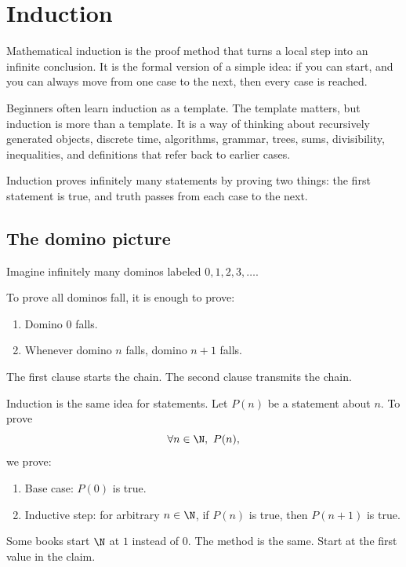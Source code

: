 \newpage
\section{Induction}

Mathematical induction is the proof method that turns a local step into an infinite conclusion. It is the formal version of a simple idea: if you can start, and you can always move from one case to the next, then every case is reached.

Beginners often learn induction as a template. The template matters, but induction is more than a template. It is a way of thinking about recursively generated objects, discrete time, algorithms, grammar, trees, sums, divisibility, inequalities, and definitions that refer back to earlier cases.

\begin{focusbox}
Induction proves infinitely many statements by proving two things: the first statement is true, and truth passes from each case to the next.
\end{focusbox}

\subsection{The domino picture}

Imagine infinitely many dominos labeled $0,1,2,3,\ldots$.

To prove all dominos fall, it is enough to prove:

\begin{enumerate}
\item Domino $0$ falls.
\item Whenever domino $n$ falls, domino $n+1$ falls.
\end{enumerate}

The first clause starts the chain. The second clause transmits the chain.

Induction is the same idea for statements. Let $P(n)$ be a statement about $n$. To prove
\[
\forall n\in\N,\ P(n),
\]
we prove:

\begin{enumerate}
\item Base case: $P(0)$ is true.
\item Inductive step: for arbitrary $n\in\N$, if $P(n)$ is true, then $P(n+1)$ is true.
\end{enumerate}

Some books start $\N$ at $1$ instead of $0$. The method is the same. Start at the first value in the claim.

